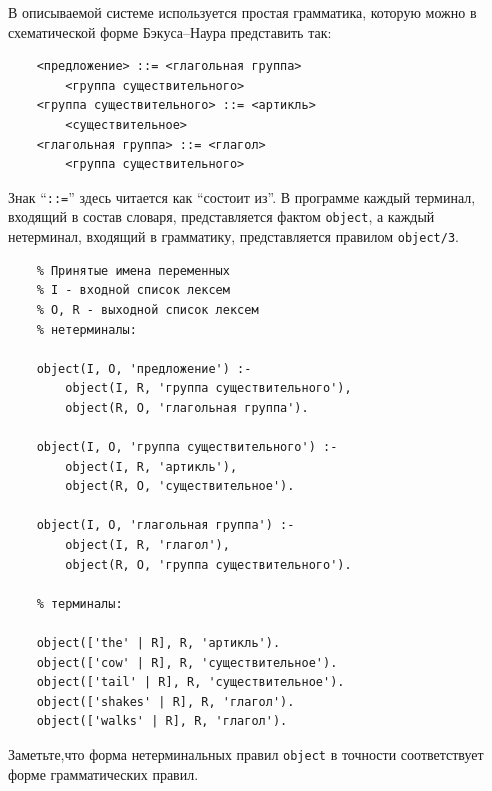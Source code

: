 \documentclass[12pt, openany, twoside]{book} %
\begin{document}
В описываемой системе используется простая грамматика, которую можно в схематической форме Бэкуса--Наура представить так:
{\tt\begin{verbatim}
    <предложение> ::= <глагольная группа>
        <группа существительного>
    <группа существительного> ::= <артикль>
        <существительное>
    <глагольная группа> ::= <глагол>
        <группа существительного>
\end{verbatim}}

Знак ``{\tt ::=}'' здесь читается как ``состоит из''. В программе каждый терминал, входящий в состав словаря, представляется фактом {\tt object}, а каждый нетерминал, входящий в грамматику, представляется правилом {\tt object/3}.
{\tt\begin{verbatim}
    % Принятые имена переменных
    % I - входной список лексем
    % О, R - выходной список лексем
    % нетерминалы:

    object(I, О, 'предложение') :-
        object(I, R, 'группа существительного'),
        object(R, О, 'глагольная группа').

    object(I, О, 'группа существительного') :-
        object(I, R, 'артикль'),
        object(R, О, 'существительное').

    object(I, О, 'глагольная группа') :-
        object(I, R, 'глагол'),
        object(R, О, 'группа существительного').

    % терминалы:

    object(['the' | R], R, 'артикль').
    object(['cow' | R], R, 'существительное').
    object(['tail' | R], R, 'существительное').
    object(['shakes' | R], R, 'глагол').
    object(['walks' | R], R, 'глагол').
\end{verbatim}}

\noindent Заметьте,что форма нетерминальных правил {\tt object} в точности соответствует форме грамматических правил.
\end{document}
